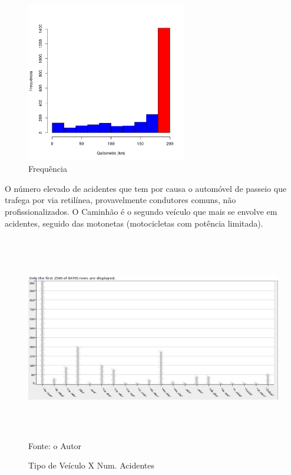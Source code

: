 \quad \quad
\begin{figure}[h]
	\centering
	\caption{ Frequência}
	\includegraphics[width=7cm,height=7cm]{Figuras/Preprocess/br428_3.png}
\end{figure}


\pagebreak

O número elevado de acidentes que tem por causa o automóvel de passeio que trafega por via retilínea, provavelmente condutores comuns, não profissionalizados.
O Caminhão é o segundo veículo que mais se envolve em acidentes, seguido das motonetas (motocicletas com potência limitada). 

\begin{figure}[!ht]
\begin{center}
\caption{Tipo de Veículo X Num. Acidentes}
\includegraphics[width=150mm, height=90mm]{Figuras/Preprocess/TipoVeiculoXNumAciden.png}\\
\tiny Fonte: o Autor
\end{center}
\end{figure}


